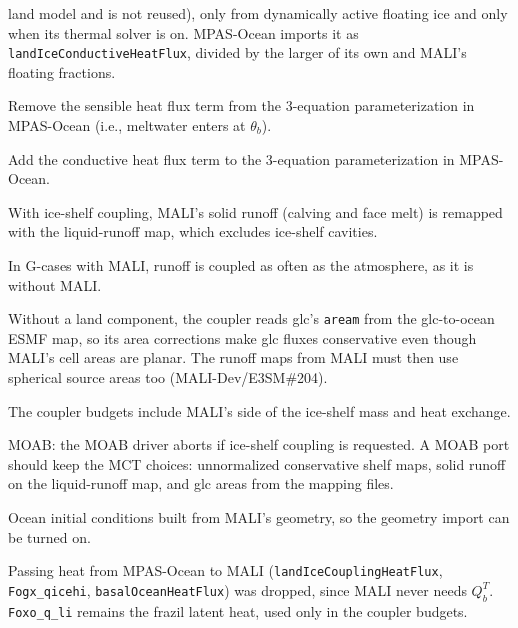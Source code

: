 \documentclass[11pt]{report}
\newcommand{\cmark}{\ding{51}}%
\newcommand{\done}{\rlap{$\square$}{\raisebox{2pt}{\large\hspace{1pt}\cmark}}%
\hspace{-2.5pt}}
\newcommand{\bea}{\begin{eqnarray}}
\newcommand{\eea}{\end{eqnarray}}
\begin{document}
\begin{todolist}
    land model and is not reused), only from dynamically active floating ice and only
    when its thermal solver is on.  MPAS-Ocean imports it as
    \texttt{landIceConductiveHeatFlux}, divided by the larger of its own and MALI's
    floating fractions.
    \item[\done] Remove the sensible heat flux term from the 3-equation parameterization in MPAS-Ocean (i.e., meltwater enters at $\theta_b$).
    \item[\done] Add the conductive heat flux term to the 3-equation parameterization in MPAS-Ocean.
    \item[\done] With ice-shelf coupling, MALI's solid runoff (calving and face melt) is
    remapped with the liquid-runoff map, which excludes ice-shelf cavities.
    \item[\done] In G-cases with MALI, runoff is coupled as often as the atmosphere,
    as it is without MALI.
    \item[\done] Without a land component, the coupler reads glc's \texttt{aream} from the
    glc-to-ocean ESMF map, so its area corrections make glc fluxes conservative even
    though MALI's cell areas are planar.  The runoff maps from MALI must then use
    spherical source areas too (MALI-Dev/E3SM\#204).
    \item[\done] The coupler budgets include MALI's side of the ice-shelf mass and heat
    exchange.
    \item MOAB: the MOAB driver aborts if ice-shelf coupling is requested.  A MOAB port
    should keep the MCT choices: unnormalized conservative shelf maps, solid runoff on
    the liquid-runoff map, and glc areas from the mapping files.
    \item Ocean initial conditions built from MALI's geometry, so the geometry import can
    be turned on.
\end{todolist}

Passing heat from MPAS-Ocean to MALI (\texttt{landIceCouplingHeatFlux},
\texttt{Fogx\_qicehi}, \texttt{basalOceanHeatFlux}) was dropped, since MALI never needs
$Q_b^T$.  \texttt{Foxo\_q\_li} remains the frazil latent heat, used only in the coupler
budgets.


\printbibliography
\end{document}
